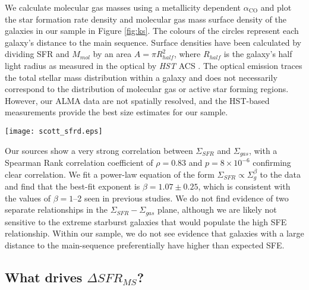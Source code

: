 \documentclass[a4paper,fleqn,usenatbib]{mnras}
\newcommand{\aco}{\alpha_{\mathrm{CO}}}
\begin{document}
We calculate molecular gas masses using a metallicity dependent $\aco$ and plot the star formation rate density and molecular gas mass surface density of the galaxies in our sample in Figure \ref{fig:ks}. The colours of the circles represent each galaxy's distance to the main sequence. Surface densities have been calculated by dividing SFR and $M_{mol}$ by an area  $A=\pi R_{half}^{2}$, where $R_{half}$ is the galaxy's half light radius as measured in the optical by {\em HST} ACS \citep{2009A&A...503..379T}. The optical emission traces the total stellar mass distribution within a galaxy and does not necessarily correspond to the distribution of molecular gas or active star forming regions. However, our ALMA data are not spatially resolved, and the HST-based measurements provide the best size estimates for our sample.

\begin{figure*}
\centering
\texttt{[image: scott\_sfrd.eps]}
\caption{Star formation rate surface density as a function of gas surface density.  Surface densities are calculated by dividing SFR and $M_{mol}$ by an area $A=\pi R_{half}^{2}$, where $R_{half}$ is the galaxy's half light radius as measured in the optical by {\em HST} ACS \citep{2009A&A...503..379T}.  The colours of the symobls represents the distance to the main sequence as indicated in the vertical colour bar. We fit a power-law of the form $\Sigma_{SFR} \propto \Sigma_{g}^{\beta}$ and find the best-fit relationship shown as the dashed red line.}
\label{fig:ks}
\end{figure*}

Our sources show a very strong correlation between $\Sigma_{SFR}$ and $\Sigma_{gas}$, with a Spearman Rank correlation coefficient of $\rho = 0.83$ and $p = 8 \times 10^{-6}$ confirming clear correlation. We fit a power-law equation of the form $\Sigma_{SFR} \propto \Sigma_{g}^{\beta}$ to the data and find that the best-fit exponent is $\beta = 1.07 \pm 0.25$, which is consistent with the values of $\beta = 1$--2 seen in previous studies. We do not find evidence of two separate relationships in the $\Sigma_{SFR}-\Sigma_{gas}$ plane, although we are likely not sensitive to the extreme starburst galaxies that would populate the high SFE relationship. Within our sample, we do not see evidence that galaxies with a large distance to the main-sequence preferentially have higher than expected SFE. 


\subsection{What drives $\Delta SFR_{MS}$?}
\end{document}
